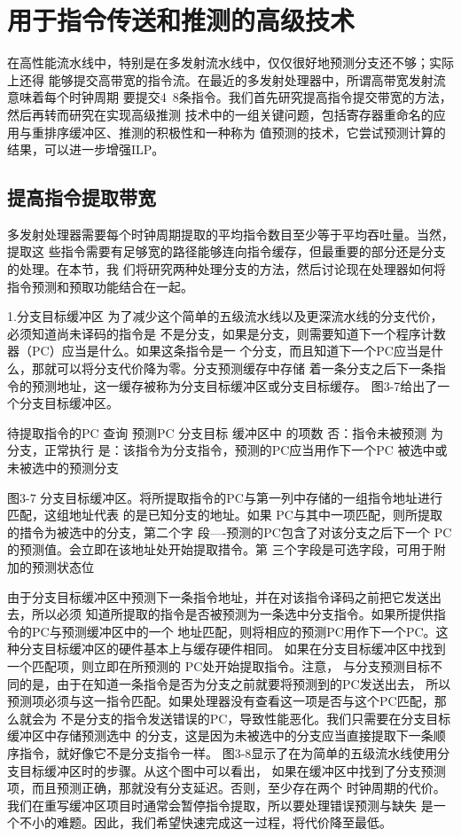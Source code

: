 \section{用于指令传送和推测的高级技术}

在高性能流水线中，特别是在多发射流水线中，仅仅很好地预测分支还不够；实际上还得
能够提交高带宽的指令流。在最近的多发射处理器中，所谓高带宽发射流意味着每个时钟周期
要提交4~8条指令。我们首先研究提高指令提交带宽的方法，然后再转而研究在实现高级推测
技术中的一组关键问题，包括寄存器重命名的应用与重排序缓冲区、推测的积极性和一种称为
值预测的技术，它尝试预测计算的结果，可以进一步增强ILP。
\subsection{提高指令提取带宽}

多发射处理器需要每个时钟周期提取的平均指令数目至少等于平均吞吐量。当然，提取这
些指令需要有足够宽的路径能够连向指令缓存，但最重要的部分还是分支的处理。在本节，我
们将研究两种处理分支的方法，然后讨论现在处理器如何将指令预测和预取功能结合在一起。

1.分支目标缓冲区
为了减少这个简单的五级流水线以及更深流水线的分支代价，必须知道尚未译码的指令是
不是分支，如果是分支，则需要知道下一个程序计数器（PC）应当是什么。如果这条指令是一
个分支，而且知道下一个PC应当是什么，那就可以将分支代价降为零。分支预测缓存中存储
着一条分支之后下一条指令的预测地址，这一缓存被称为分支目标缓冲区或分支目标缓存。
图3-7给出了一个分支目标缓冲区。

待提取指令的PC
查询
预测PC
分支目标
缓冲区中
的项数
否：指令未被预测
为分支，正常执行
是：该指令为分支指令，预测的PC应当用作下一个PC
被选中或未被选中的预测分支

图3-7 分支目标缓冲区。将所提取指令的PC与第一列中存储的一组指令地址进行匹配，这组地址代表
的是已知分支的地址。如果 PC与其中一项匹配，则所提取的措令为被选中的分支，第二个字
段—-预测的PC包含了对该分支之后下一个 PC的预测值。会立即在该地址处开始提取措令。第
三个字段是可选字段，可用于附加的预测状态位

由于分支目标缓冲区中预测下一条指令地址，并在对该指令译码之前把它发送出去，所以必须
知道所提取的指令是否被预测为一条选中分支指令。如果所提供指令的PC与预测缓冲区中的一个
地址匹配，则将相应的预测PC用作下一个PC。这种分支目标缓冲区的硬件基本上与缓存硬件相同。
如果在分支目标缓冲区中找到一个匹配项，则立即在所预测的 PC处开始提取指令。注意，
与分支预测目标不同的是，由于在知道一条指令是否为分支之前就要将预测到的PC发送出去，
所以预测项必须与这一指令匹配。如果处理器没有查看这一项是否与这个PC匹配，那么就会为
不是分支的指令发送错误的PC，导致性能恶化。我们只需要在分支目标缓冲区中存储预测选中
的分支，这是因为未被选中的分支应当直接提取下一条顺序指令，就好像它不是分支指令一样。
图3-8显示了在为简单的五级流水线使用分支目标缓冲区时的步骤。从这个图中可以看出，
如果在缓冲区中找到了分支预测项，而且预测正确，那就没有分支延迟。否则，至少存在两个
时钟周期的代价。我们在重写缓冲区项目时通常会暂停指令提取，所以要处理错误预测与缺失
是一个不小的难题。因此，我们希望快速完成这一过程，将代价降至最低。

